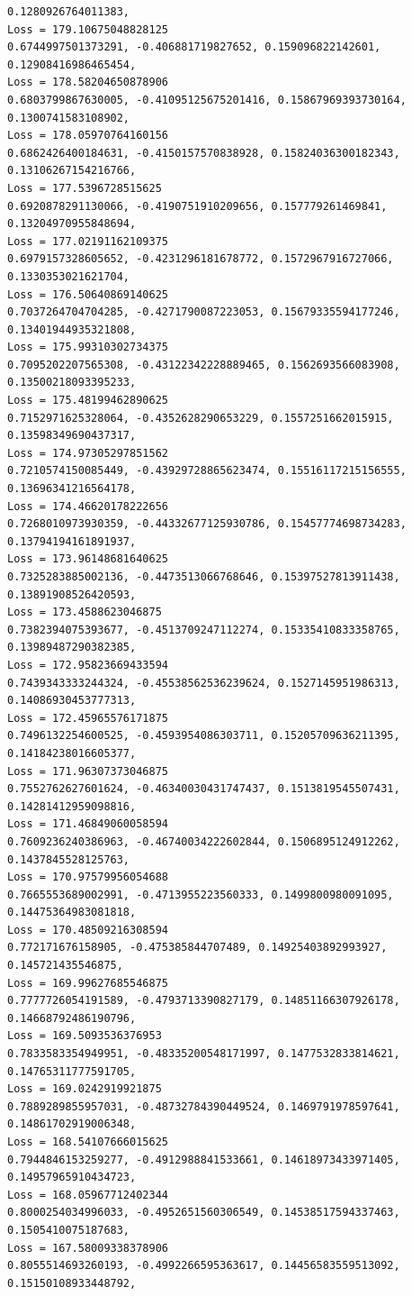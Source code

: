 \documentclass[11pt]{article}
\begin{document}
\begin{Verbatim}[commandchars=\\\{\}]
0.1280926764011383,
Loss = 179.10675048828125
0.6744997501373291, -0.406881719827652, 0.159096822142601, 0.12908416986465454,
Loss = 178.58204650878906
0.6803799867630005, -0.41095125675201416, 0.15867969393730164,
0.1300741583108902,
Loss = 178.05970764160156
0.6862426400184631, -0.4150157570838928, 0.15824036300182343,
0.13106267154216766,
Loss = 177.5396728515625
0.6920878291130066, -0.4190751910209656, 0.157779261469841, 0.13204970955848694,
Loss = 177.02191162109375
0.6979157328605652, -0.4231296181678772, 0.1572967916727066, 0.1330353021621704,
Loss = 176.50640869140625
0.7037264704704285, -0.4271790087223053, 0.15679335594177246,
0.13401944935321808,
Loss = 175.99310302734375
0.7095202207565308, -0.43122342228889465, 0.1562693566083908,
0.13500218093395233,
Loss = 175.48199462890625
0.7152971625328064, -0.4352628290653229, 0.1557251662015915,
0.13598349690437317,
Loss = 174.97305297851562
0.7210574150085449, -0.43929728865623474, 0.15516117215156555,
0.13696341216564178,
Loss = 174.46620178222656
0.7268010973930359, -0.44332677125930786, 0.15457774698734283,
0.13794194161891937,
Loss = 173.96148681640625
0.7325283885002136, -0.4473513066768646, 0.15397527813911438,
0.13891908526420593,
Loss = 173.4588623046875
0.7382394075393677, -0.4513709247112274, 0.15335410833358765,
0.13989487290382385,
Loss = 172.95823669433594
0.7439343333244324, -0.45538562536239624, 0.1527145951986313,
0.14086930453777313,
Loss = 172.45965576171875
0.7496132254600525, -0.4593954086303711, 0.15205709636211395,
0.14184238016605377,
Loss = 171.96307373046875
0.7552762627601624, -0.46340030431747437, 0.1513819545507431,
0.14281412959098816,
Loss = 171.46849060058594
0.7609236240386963, -0.46740034222602844, 0.1506895124912262,
0.1437845528125763,
Loss = 170.97579956054688
0.7665553689002991, -0.4713955223560333, 0.1499800980091095,
0.14475364983081818,
Loss = 170.48509216308594
0.772171676158905, -0.475385844707489, 0.14925403892993927, 0.145721435546875,
Loss = 169.99627685546875
0.7777726054191589, -0.4793713390827179, 0.14851166307926178,
0.14668792486190796,
Loss = 169.5093536376953
0.7833583354949951, -0.48335200548171997, 0.1477532833814621,
0.14765311777591705,
Loss = 169.0242919921875
0.7889289855957031, -0.48732784390449524, 0.1469791978597641,
0.14861702919006348,
Loss = 168.54107666015625
0.7944846153259277, -0.4912988841533661, 0.14618973433971405,
0.14957965910434723,
Loss = 168.05967712402344
0.8000254034996033, -0.4952651560306549, 0.14538517594337463,
0.1505410075187683,
Loss = 167.58009338378906
0.8055514693260193, -0.4992266595363617, 0.14456583559513092,
0.15150108933448792,

\end{Verbatim}
\end{document}
